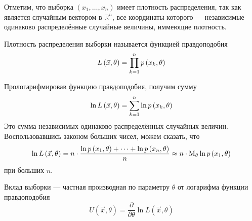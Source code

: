 
Отметим, что выборка $\left( x_1, \dots, x_n \right)$ имеет плотность
распределения, так как является случайным вектором в $\mathbb{R}^n$,
все координаты которого --- независимые одинаково распределённые случайные
величины, иммеющие плотность.

\begin{definition}
  \label{def:likehoodFunction}
  Плотность распределения выборки называется функцией правдоподобия
  \begin{equation*}
    L\left( \vec{x}, \theta \right) = \prod_{k=1}^n p\left(x_k, \theta\right)
  \end{equation*}
\end{definition}

Прологарифмировав функцию правдоподобия, получим сумму
\begin{equation*}
  \ln{L\left( \vec{x}, \theta \right)}
  = \sum_{k=1}^n \ln{p\left(x_k, \theta\right)}
\end{equation*}
Это сумма независимых одинаково распределённых случайных величин.
Воспользовавшись законом больших чисел, можем сказать,
что
\begin{equation*}
  \ln{L\left( \vec{x}, \theta \right)}
  = n \cdot \frac{\ln{p\left(x_1, \theta\right)} + \dots + \ln{p\left(x_n, \theta\right)}}{n}
  \approx n \cdot \operatorname{M}_{\theta} \ln{p\left(x_1, \theta\right)}
\end{equation*}
при больших $n$.


\begin{definition}\label{def:defU}
  Вклад выборки --- частная производная по параметру $\theta$
  от логарифма функции правдоподобия
  $$U\left( \vec{x},\theta \right)
      = \frac{\partial}{\partial\theta}\ln{L\left(\vec{x},\theta\right)}$$
\end{definition}


